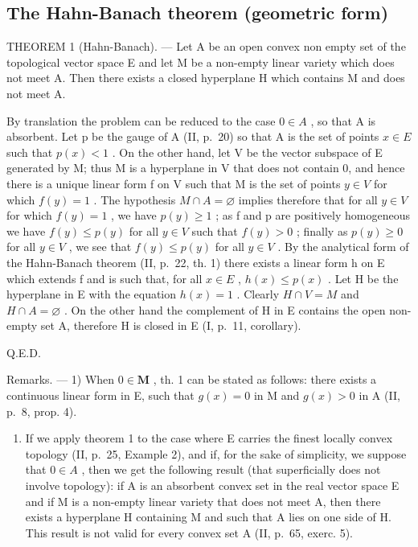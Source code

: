 \subsection{The Hahn-Banach theorem (geometric form)}

THEOREM 1 (Hahn-Banach). --- Let A be an open convex non empty set of the topological vector space E and let M be a non-empty linear variety which does not meet A. Then there exists a closed hyperplane H which contains M and does not meet A.

By translation the problem can be reduced to the case \(0 \in A\) , so that A is absorbent. Let p be the gauge of A (II, p.~20) so that A is the set of points \(x \in E\) such that \(p(x) < 1\) . On the other hand, let V be the vector subspace of E generated by M; thus M is a hyperplane in V that does not contain 0, and hence there is a unique linear form f on V such that M is the set of points \(y \in V\) for which \(f(y) = 1\) . The hypothesis \(M \cap A = \varnothing\) implies therefore that for all \(y \in V\) for which \(f(y) = 1\) , we have \(p(y) \geqslant 1\) ; as f and p are positively homogeneous we have \(f(y) \leqslant p(y)\) for all \(y \in V\) such that \(f(y) > 0\) ; finally as \(p(y) \geqslant 0\) for all \(y \in V\) , we see that \(f(y) \leqslant p(y)\) for all \(y \in V\) . By the analytical form of the Hahn-Banach theorem (II, p.~22, th. 1) there exists a linear form h on E which extends f and is such that, for all \(x \in E\) , \(h(x) \leqslant p(x)\) . Let H be the hyperplane in E with the equation \(h(x) = 1\) . Clearly \(H \cap V = M\) and \(H \cap A = \varnothing\) . On the other hand the complement of H in E contains the open non-empty set A, therefore H is closed in E (I, p.~11, corollary).

Q.E.D.

Remarks. --- 1) When \(0 \in \mathbf{M}\) , th. 1 can be stated as follows: there exists a continuous linear form in E, such that \(g(x) = 0\) in M and \(g(x) > 0\) in A (II, p.~8, prop. 4).

\begin{enumerate}
\def\labelenumi{\arabic{enumi})}
\setcounter{enumi}{1}
\tightlist
\item
  If we apply theorem 1 to the case where E carries the finest locally convex topology (II, p.~25, Example 2), and if, for the sake of simplicity, we suppose that \(0 \in A\) , then we get the following result (that superficially does not involve topology): if A is an absorbent convex set in the real vector space E and if M is a non-empty linear variety that does not meet A, then there exists a hyperplane H containing M and such that A lies on one side of H. This result is not valid for every convex set A (II, p.~65, exerc. 5).
\end{enumerate}

